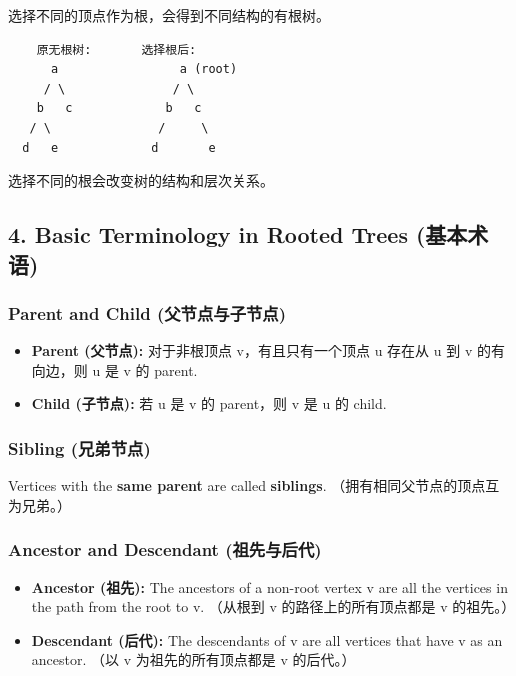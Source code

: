 \documentclass[10pt,a4paper,openany]{ctexbook}
\theoremstyle{definition}
\theoremstyle{remark}
\begin{document}
选择不同的顶点作为根，会得到不同结构的有根树。
{\footnotesize\begin{verbatim}
    原无根树:       选择根后:
      a                 a (root)
     / \               / \
    b   c             b   c
   / \               /     \
  d   e             d       e
\end{verbatim}}

选择不同的根会改变树的结构和层次关系。
\vspace{-2pt}

\subsection{4. Basic Terminology in Rooted Trees (基本术语)}

\subsubsection{Parent and Child (父节点与子节点)}

\begin{itemize}
\item \textbf{Parent (父节点):} 对于非根顶点 v，有且只有一个顶点 u 存在从 u 到 v 的有向边，则 u 是 v 的 parent.
\item \textbf{Child (子节点):} 若 u 是 v 的 parent，则 v 是 u 的 child.

\end{itemize}

\subsubsection{Sibling (兄弟节点)}

Vertices with the \textbf{same parent} are called \textbf{siblings}.
（拥有相同父节点的顶点互为兄弟。）
\subsubsection{Ancestor and Descendant (祖先与后代)}

\begin{itemize}
\item \textbf{Ancestor (祖先):} The ancestors of a non-root vertex v are all the vertices in the path from the root to v. （从根到 v 的路径上的所有顶点都是 v 的祖先。）
\item \textbf{Descendant (后代):} The descendants of v are all vertices that have v as an ancestor. （以 v 为祖先的所有顶点都是 v 的后代。）

\end{itemize}
\end{document}
